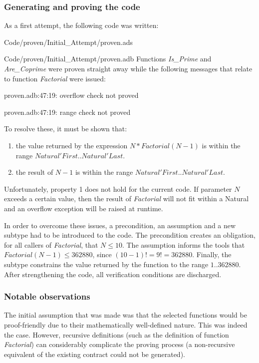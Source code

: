 \documentclass{llncs}
\begin{document}
\subsubsection{Generating and proving the code}
As a first attempt, the following code was written:

                {Code/proven/Initial_Attempt/proven.ads}

                {Code/proven/Initial_Attempt/proven.adb}
Functions \emph{Is\_Prime} and \emph{Are\_Coprime} were proven straight away while the
following messages that relate to function \emph{Factorial} were issued:

proven.adb:47:19: overflow check not proved

proven.adb:47:19: range check not proved

\noindent
To resolve these, it must be shown that:
\begin{enumerate}
  \item the value returned by the expression $N * Factorial (N - 1)$ is within
    the range $Natural'First .. Natural'Last$.

  \item the result of $N - 1$ is within the range $Natural'First .. Natural'Last$.
\end{enumerate}
Unfortunately, property 1 does not hold for the current code. If parameter
$N$ exceeds a certain value, then the result of \emph{Factorial} will not fit
within a Natural and an overflow exception will be raised at runtime.

In order to overcome these issues, a precondition, an assumption and a new
subtype had to be introduced to the code. The precondition creates an obligation,
for all callers of \emph{Factorial}, that $N \leq 10$. The assumption informs the tools
that $Factorial (N - 1) \leq 362880$, since $(10 - 1)! = 9! = 362880$. Finally, the
subtype constrains the value returned by the function to the range $1 .. 362880$.
After strengthening the code, all verification conditions are discharged.




\subsubsection{Notable observations}
The initial assumption that was made was that the selected functions would be
proof-friendly due to their mathematically well-defined nature. This was indeed
the case. However, recursive definitions (such as the definition of function
\emph{Factorial}) can considerably complicate the proving process (a non-recursive
equivalent of the existing contract could not be generated).
\end{document}
